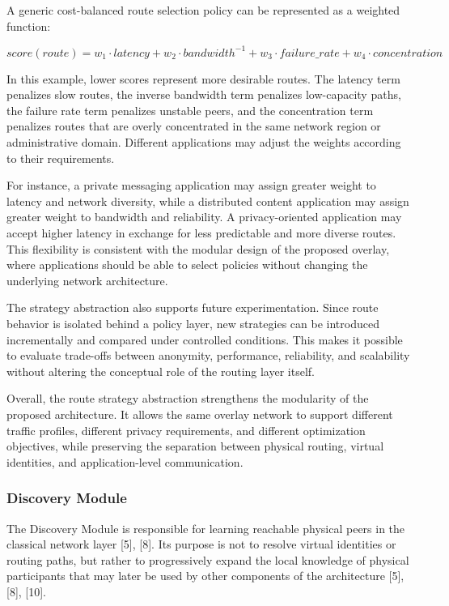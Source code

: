 \documentclass[12pt,a4paper]{article}
\begin{document}
A generic cost-balanced route selection policy can be represented as a weighted
function:

\[
score(route) =
w_1 \cdot latency +
w_2 \cdot bandwidth^{-1} +
w_3 \cdot failure\_rate +
w_4 \cdot concentration
\]

In this example, lower scores represent more desirable routes. The latency term
penalizes slow routes, the inverse bandwidth term penalizes low-capacity paths, the
failure rate term penalizes unstable peers, and the concentration term penalizes routes
that are overly concentrated in the same network region or administrative domain.
Different applications may adjust the weights according to their requirements.

For instance, a private messaging application may assign greater weight to latency and
network diversity, while a distributed content application may assign greater weight to
bandwidth and reliability. A privacy-oriented application may accept higher latency in
exchange for less predictable and more diverse routes. This flexibility is consistent
with the modular design of the proposed overlay, where applications should be able to
select policies without changing the underlying network architecture.

The strategy abstraction also supports future experimentation. Since route behavior is
isolated behind a policy layer, new strategies can be introduced incrementally and
compared under controlled conditions. This makes it possible to evaluate trade-offs
between anonymity, performance, reliability, and scalability without altering the
conceptual role of the routing layer itself.

Overall, the route strategy abstraction strengthens the modularity of the proposed
architecture. It allows the same overlay network to support different traffic profiles,
different privacy requirements, and different optimization objectives, while preserving
the separation between physical routing, virtual identities, and application-level
communication.






\subsubsection{Discovery Module}


\thesispeerdiscoverytikz


The Discovery Module is responsible for learning reachable physical peers in the classical network layer [5], [8]. Its purpose is not to resolve virtual identities or routing paths, but rather to progressively expand the local knowledge of physical participants that may later be used by other components of the architecture [5], [8], [10].
\end{document}
